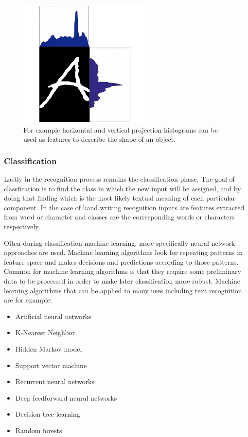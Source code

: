\documentclass{article}
\begin{document}
        \begin{figure}[!ht]
          \centering
          \includegraphics[natwidth=248,natheight=245,scale = 0.6]{feature_extraction.png}
          \caption{For example horizontal and vertical projection histograms can be used as features to describe the shape of an object.\label{fig:feature}}
        \end{figure}

      \subsubsection{Classification}
        Lastly in the recognition process remains the classification phase. The goal of classfication is to find the class in which the new input will be assigned, and by doing that finding which is the most likely textual meaning of each particular component. In the case of hand writing recognition inputs are features extracted from word or character and classes are the corresponding words or characters respectively.

        Often during classification machine learning, more specifically neural network approaches are used. Machine learning algorithms look for repeating patterns in feature space and makes decisions and predictions according to those patterns. Common for machine learning algorithms is that they require some preliminary data to be processed in order to make later classification more robust. Machine learning algorithms that can be applied to many uses including text recognition are for example:

        \begin{itemize}
          \item Artificial neural networks
          \item K-Nearest Neighbor
          \item Hidden Markov model
          \item Support vector machine
          \item Recurrent neural networks
          \item Deep feedforward neural networks
          \item Decision tree learning
          \item Random forests  \cite{SAS}
        \end{itemize}
\end{document}
